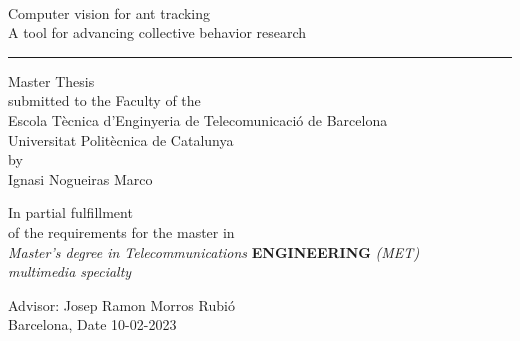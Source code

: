 
\thispagestyle{empty}

\begin{center}

    { %
    \sffamily
    \\
    \vspace{1cm}

    { %
    \Huge 	Computer vision for ant tracking\\
    \LARGE  A tool for advancing collective behavior research
    }

    \vspace{0.5cm}
    {\color{black}\hrule height 1pt}
    \vspace{1cm}

    { %
    \large{
        Master Thesis\\
        submitted to the Faculty of the \\
        Escola T\`ecnica d'Enginyeria de Telecomunicaci\'o de Barcelona \\
        Universitat Polit\`ecnica de Catalunya \\
        by\\
        \vspace{0.4cm}
        Ignasi Nogueiras Marco
        }
    }

    \vspace{1.5cm}

    { %
    In partial fulfillment\\
    of the requirements for the master in\\
    \textit{Master's degree in Telecommunications} \textbf{ENGINEERING} \textit{(MET)}\\
    \textit{multimedia specialty}
    }

    \vspace{2cm}

    {{Advisor: Josep Ramon Morros Rubió}} \\
    {{Barcelona, Date 10-02-2023}}
    \thispagestyle{alim}
    }

\end{center}